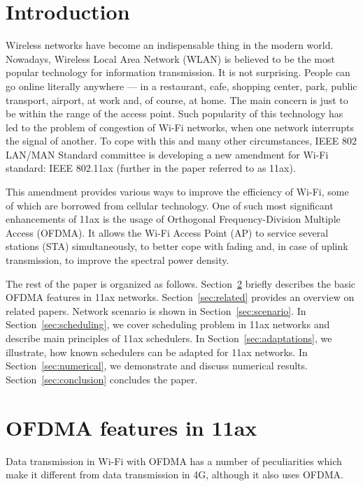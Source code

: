 \section{Introduction}
Wireless networks have become an indispensable thing in the modern world.
Nowadays, Wireless Local Area Network (WLAN) is believed to be the most popular technology for information transmission. 
It is not surprising. 
People can go online literally anywhere --- in a restaurant, cafe, shopping center, park, public transport, airport, at work and, of course, at home. 
The main concern is just to be within the range of the access point. 
Such popularity of this technology has led to the problem of congestion of Wi-Fi networks, when one network interrupts the signal of another. 
To cope with this and many other circumstances, IEEE 802 LAN/MAN Standard committee is developing a new amendment for Wi-Fi standard: IEEE 802.11ax (further in the paper referred to as 11ax). 

This amendment provides various ways to improve the efficiency of Wi-Fi, some of which are borrowed from cellular technology.
One of such most significant enhancements of 11ax is the usa\-ge of Orthogonal Frequency-Division Multiple Access (OFDMA). 
It allows the Wi-Fi Access Point (AP) to service several stations (STA) simultaneously, to better cope with fading and, in case of uplink transmission, to improve the spectral power density.

The rest of the paper is organized as follows.
Section~\ref{sec:features} briefly describes the basic OFDMA features in 11ax networks.
Section~\ref{sec:related} provides an overview on related papers.
Network scenario is shown in Section~\ref{sec:scenario}.
In Section~\ref{sec:scheduling}, we cover scheduling problem in 11ax networks and describe main principles of 11ax schedulers.
In Section~\ref{sec:adaptations}, we illustrate, how known schedulers can be adapted for 11ax networks.
In Section~\ref{sec:numerical}, we demonstrate and discuss numerical results. 
Section~\ref{sec:conclusion} concludes the paper.
\section{OFDMA features in 11ax}
\label{sec:features}

Data transmission in Wi-Fi with OFDMA has a number of peculiarities which make it different from data transmission in 4G, although it also uses OFDMA.

